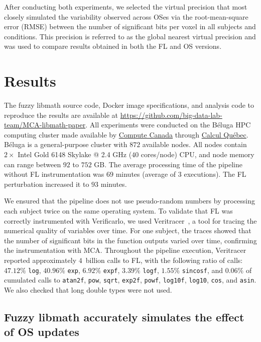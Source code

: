 After conducting both experiments, we selected the virtual precision that most
closely simulated the variability observed across OSes via the root-mean-square
error (RMSE) between the number of significant bits per voxel in all subjects
and conditions. This precision is referred to as the global nearest virtual precision
and was used to compare results obtained in both the FL and OS versions.

\section{Results}

The fuzzy libmath source code, Docker image specifications, and analysis code to
reproduce the results are available at \url{https://github.com/big-data-lab-team/MCA-libmath-paper}.
All experiments were conducted on the Béluga HPC computing cluster made
available by \href{https://www.computecanada.ca}{Compute Canada} through
\href{https://www.calculquebec.ca}{Calcul Québec}. Béluga is a general-purpose
cluster with $872$ available nodes. All nodes contain $2 \times$ Intel Gold 6148
Skylake @ 2.4 GHz ($40$ cores/node) CPU, and node memory can range between $92$
to $752$ GB. The average processing time of the pipeline without FL
instrumentation was $69$ minutes (average of 3 executions). The FL perturbation increased it to $93$ minutes.

We ensured that the pipeline does not use pseudo-random numbers by processing each subject twice on the same operating system.
To validate that FL was correctly instrumented with
Verificarlo, we used Veritracer~\cite{chatelain2018veritracer}, a tool for
tracing the numerical quality of variables over time.
For one subject, the traces showed that the number of significant bits
in the function outputs varied over time, confirming the instrumentation with MCA.
Throughout the pipeline execution, Veritracer reported approximately $4$~billion calls to FL,
with the following ratio of calls: $47.12\%$ \texttt{log},
$40.96\%$ \texttt{exp}, $6.92\%$ \texttt{expf}, $3.39\%$ \texttt{logf},
$1.55\%$ \texttt{sincosf}, and $0.06\%$ of cumulated calls to \texttt{atan2f},
\texttt{pow}, \texttt{sqrt}, \texttt{exp2f}, \texttt{powf}, \texttt{log10f}, \texttt{log10}, \texttt{cos}, and \texttt{asin}.
We also checked that long double types were not used.

\subsection{Fuzzy libmath accurately simulates the effect of OS updates}

